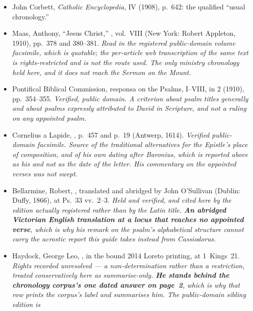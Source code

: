 \begin{itemize}[leftmargin=1.2em, itemsep=0.15em]
\item John Corbett,  \emph{Catholic Encyclopedia}, IV (1908), p.~642: the qualified ``usual chronology.''
\item Maas, Anthony, ``Jesus Christ,'' ,
vol.~VIII (New York: Robert Appleton, 1910), pp.~378 and 380--381.
\textit{Read in the registered public-domain \emph{volume facsimile}, which is
quotable; the per-article web transcription of the same text is
rights-restricted and is not the route used. The only ministry chronology held
here, and it does not reach the Sermon on the Mount.}
\item Pontifical Biblical Commission, responsa on the Psalms, I--VIII, in
 2 (1910), pp.~354--355. \textit{Verified,
public domain. A criterion about psalm titles generally and about psalms
expressly attributed to David in Scripture, and not a ruling on any appointed
psalm.}
\item Cornelius a Lapide, ,
 p.~457 and  p.~19 (Antwerp, 1614).
\textit{Verified public-domain facsimile. Source of the traditional
alternatives for the Epistle's place of composition, and of his own dating
after Baronius, which is reported above as his and not as the date of the
letter. His commentary on the appointed verses was not swept.}
\item Bellarmine, Robert, , translated
and abridged by John O'Sullivan (Dublin: Duffy, 1866), at Ps.~33 vv.~2--3.
\textit{Held and verified, and cited here by the edition actually registered
rather than by the Latin title. \textbf{An abridged Victorian English
translation at a locus that reaches no appointed verse}, which is why his
remark on the psalm's alphabetical structure cannot carry the acrostic report
this guide takes instead from Cassiodorus.}
\item Haydock, George Leo, , in the bound 2014 Loreto printing, at 1~Kings~21. \textit{Rights
recorded \emph{unresolved} --- a non-determination rather than a restriction,
treated conservatively here as summarise-only. \textbf{He stands behind the
chronology corpus's one dated answer on page~2}, which is why that row prints
the corpus's label and summarises him. The public-domain sibling edition is
}
\end{itemize}

